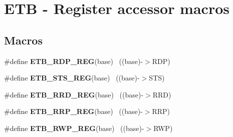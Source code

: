 \hypertarget{group___e_t_b___register___accessor___macros}{}\section{E\+T\+B -\/ Register accessor macros}
\label{group___e_t_b___register___accessor___macros}
\subsection*{Macros}
\begin{DoxyCompactItemize}
\item 
\hypertarget{group___e_t_b___register___accessor___macros_ga36817424cf06e4403d00506c273da5c5}{}\#define {\bfseries E\+T\+B\+\_\+\+R\+D\+P\+\_\+\+R\+E\+G}(base)                                            ~((base)-\/$>$R\+D\+P)\label{group___e_t_b___register___accessor___macros_ga36817424cf06e4403d00506c273da5c5}

\item 
\hypertarget{group___e_t_b___register___accessor___macros_ga36fdad4715d60bf038d1a4ccaab29977}{}\#define {\bfseries E\+T\+B\+\_\+\+S\+T\+S\+\_\+\+R\+E\+G}(base)                                            ~((base)-\/$>$S\+T\+S)\label{group___e_t_b___register___accessor___macros_ga36fdad4715d60bf038d1a4ccaab29977}

\item 
\hypertarget{group___e_t_b___register___accessor___macros_gad98611ab8b9a51e840c08af04d652539}{}\#define {\bfseries E\+T\+B\+\_\+\+R\+R\+D\+\_\+\+R\+E\+G}(base)                                            ~((base)-\/$>$R\+R\+D)\label{group___e_t_b___register___accessor___macros_gad98611ab8b9a51e840c08af04d652539}

\item 
\hypertarget{group___e_t_b___register___accessor___macros_ga72cdf2426cfe669c82dee1963a612045}{}\#define {\bfseries E\+T\+B\+\_\+\+R\+R\+P\+\_\+\+R\+E\+G}(base)                                            ~((base)-\/$>$R\+R\+P)\label{group___e_t_b___register___accessor___macros_ga72cdf2426cfe669c82dee1963a612045}

\item 
\hypertarget{group___e_t_b___register___accessor___macros_gae99824f4296f3c7e023f412fe54b6148}{}\#define {\bfseries E\+T\+B\+\_\+\+R\+W\+P\+\_\+\+R\+E\+G}(base)                                            ~((base)-\/$>$R\+W\+P)\label{group___e_t_b___register___accessor___macros_gae99824f4296f3c7e023f412fe54b6148}


\end{DoxyCompactItemize}
